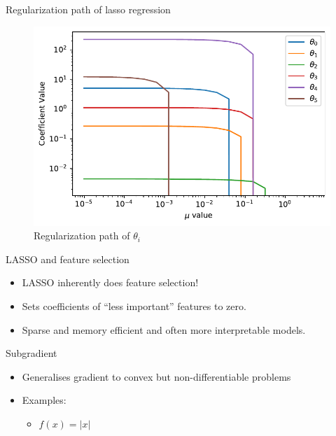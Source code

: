 \documentclass{beamer}
\begin{document}
\begin{frame}{Regularization path of lasso regression}
\begin{figure}
    \centering
    \includegraphics[scale = 0.5]{../assets/lasso-regression/figures/lasso_reg.pdf}
    \caption{Regularization path of $\theta_{i}$}
    \label{fig:my_label}
\end{figure}

\end{frame}


\begin{frame}{LASSO and feature selection}
\begin{itemize}[<+->]
	\item LASSO inherently does feature selection!
	\item Sets coefficients of ``less important'' features to zero.
	\item Sparse and memory efficient and often more interpretable models.
\end{itemize}
\end{frame}

\begin{frame}{Subgradient }
\begin{itemize}
	
	
	\item Generalises gradient to convex but non-differentiable problems
	\item Examples:
	\begin{itemize}
		\item $f(x) = |x|$
	\end{itemize}
	
\end{itemize}
\end{frame}
\end{document}
